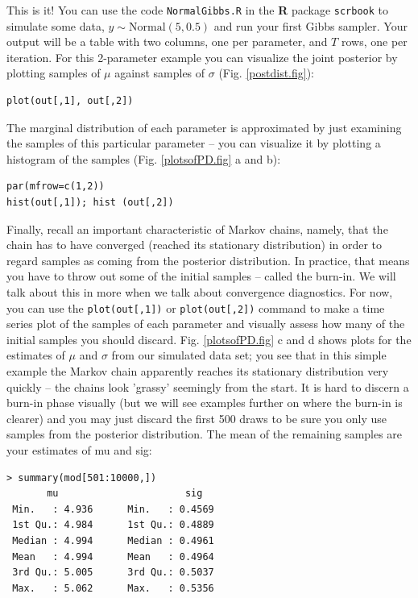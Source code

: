 This is it! You can use the code \mbox{\tt NormalGibbs.R} in the {\bf
  R} package \mbox{\tt scrbook}
to simulate some data, $y \sim \mbox{Normal}(5, 0.5)$ and run your first
Gibbs sampler. Your output will be a table with two columns, one per
parameter, and $T$ rows, one per iteration. For this 2-parameter example
you can visualize the joint posterior by plotting samples of $\mu$
against samples of $\sigma$ (Fig. \ref{postdist.fig}):
\begin{verbatim}
plot(out[,1], out[,2])
\end{verbatim}
The marginal distribution of each parameter is approximated by just
examining the samples of this particular parameter – you can visualize
it by plotting a histogram of the samples (Fig. \ref{plotsofPD.fig} a and b):
\begin{verbatim}
par(mfrow=c(1,2))
hist(out[,1]); hist (out[,2])
\end{verbatim}

Finally, recall an important characteristic of Markov chains, namely,
that the chain has to have converged (reached its stationary
distribution) in order to regard samples as coming from the posterior distribution. In
practice, that means you have to throw out some of the initial samples
– called the burn-in. We will talk about this in more when we talk
about convergence diagnostics. For now, you can use the
\verb#plot(out[,1])# or \verb#plot(out[,2])# command to make a time
series plot of the samples of each parameter and visually assess how
many of the initial samples you should discard. Fig. \ref{plotsofPD.fig} c and d shows
plots for the estimates of $\mu$ and $\sigma$ from our simulated data set;
you see that in this simple example the Markov chain apparently
reaches its stationary distribution very quickly – the chains look
'grassy' seemingly from the start. It is hard to discern a burn-in
phase visually (but we will see examples further on where the burn-in
is clearer) and you may just discard the first 500 draws to be sure
you only use samples from the posterior distribution. The mean of the
remaining samples are your estimates of mu and sig:
\begin{verbatim}
> summary(mod[501:10000,])
       mu                      sig
 Min.   : 4.936      Min.   : 0.4569
 1st Qu.: 4.984      1st Qu.: 0.4889
 Median : 4.994      Median : 0.4961
 Mean   : 4.994      Mean   : 0.4964
 3rd Qu.: 5.005      3rd Qu.: 0.5037
 Max.   : 5.062      Max.   : 0.5356
\end{verbatim}

